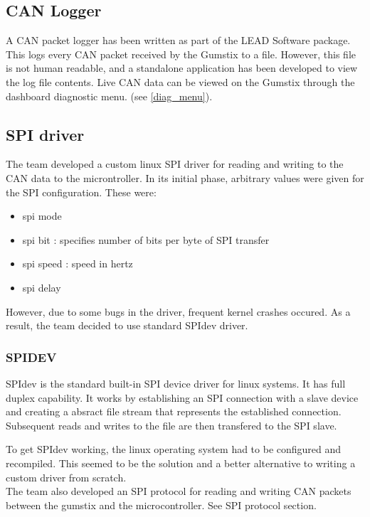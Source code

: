 \documentclass[11pt]{report} %
\begin{document}
	\subsection{CAN Logger}
	A CAN packet logger has been written as part of the LEAD Software package. This
	logs every CAN packet received by the Gumstix to a file. However, this file is not
	human readable, and a standalone application has been developed to view the log
	file contents. Live CAN data can be viewed on the Gumstix through the dashboard
	diagnostic menu. (see \ref{diag_menu}).
	
	\subsection{SPI driver}
	
	The team developed a custom linux SPI driver for reading and writing to the CAN data
	to the microntroller. In its initial phase, arbitrary values were given for the SPI configuration.
	These were:
		 
	\begin{itemize}
	\item spi mode
	\item spi bit : specifies number of bits per byte of SPI transfer
	\item spi speed : speed in hertz
	\item spi delay
	\end{itemize}
	
	However, due to some bugs in the driver, frequent kernel crashes occured. 
	As a result, the team decided to use standard SPIdev driver.
		
	\subsubsection {SPIDEV}
	SPIdev is the standard built-in SPI device driver for linux systems. It has full duplex capability.
	It works by establishing an SPI connection with a slave device and creating a absract file stream that
	represents the established connection. Subsequent reads and writes to the file are then transfered to the SPI
	slave.
		
	To get SPIdev working, the linux operating system had to be configured and recompiled. This seemed to be the solution
	and a better alternative to writing a custom driver from scratch.\\
	 
	The team also developed an SPI protocol for reading and writing CAN packets between the gumstix and the
	microcontroller. See SPI protocol section.
	 
\end{document}
